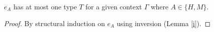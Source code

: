 \begin{lemma}
\label{uot}
\onehalfspacing
$e_{A}$ has at most one type $T$ for a given context $\Gamma$ where $A\in\lbrace H,M\rbrace$.
\begin{proof}
By structural induction on $e_{A}$ using inversion (Lemma \ref{i}).
\end{proof}
\end{lemma}